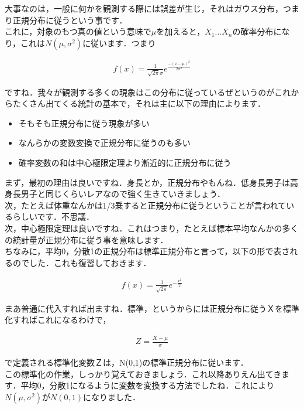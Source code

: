\documentclass[11pt,a4paper]{ujreport} 	%
\begin{document}
大事なのは，一般に何かを観測する際には誤差が生じ，それはガウス分布，つまり正規分布に従うという事です．\\

これに，対象のもつ真の値という意味で$\mu$を加えると，$X_1...X_n$の確率分布になり，これは$N(\mu, \sigma^2)$に従います．つまり

\begin{align}
  f(x) = \frac{1}{\sqrt{2\pi}\sigma}e^{\frac{-(x-\mu)^2}{2\sigma^2}}
\end{align}

ですね．我々が観測する多くの現象はこの分布に従っているぜというのがこれからたくさん出てくる統計の基本で，それは主に以下の理由によります．

\begin{itemize}
  \item そもそも正規分布に従う現象が多い
  \item なんらかの変数変換で正規分布に従うのも多い
  \item 確率変数の和は中心極限定理より漸近的に正規分布に従う
\end{itemize}

まず，最初の理由は良いですね．身長とか，正規分布やもんね．低身長男子は高身長男子と同じくらいレアなので強く生きていきましょう．\\

次，たとえば体重なんかは1/3乗すると正規分布に従うということが言われているらしいです．不思議．\\

次，中心極限定理は良いですね．これはつまり，たとえば標本平均なんかの多くの統計量が正規分布に従う事を意味します．
\\

ちなみに，平均0，分散1の正規分布は標準正規分布と言って，以下の形で表されるのでした．これも復習しておきます．

\begin{align}
  f(x) = \frac{1}{\sqrt{2\pi}}e^{-\frac{x^2}{2}}
\end{align}

まあ普通に代入すれば出ますね．標準，というからには正規分布に従うＸを標準化すればこれになるわけで，

\begin{align}
  Z = \frac{X-\mu}{\sigma}
\end{align}

で定義される標準化変数Ｚは，N(0,1)の標準正規分布に従います．\\

この標準化の作業，しっかり覚えておきましょう．これ以降ありえん出てきます．平均0，分散1になるように変数を変換する方法でしたね．これにより$N(\mu, \sigma^2)$が$N(0,1)$になりました．
\end{document}
